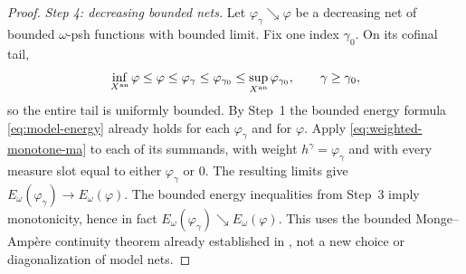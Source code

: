 \begin{proof}
\emph{Step 4: decreasing bounded nets.}  Let
\(\varphi_\gamma\searrow\varphi\) be a decreasing net of bounded
\(\omega\)-psh functions with bounded limit.  Fix one index \(\gamma_0\).
On its cofinal tail,
\[
 \inf_{X^{\mathrm{an}}}\varphi\leq\varphi\leq\varphi_\gamma
 \leq\varphi_{\gamma_0}\leq\sup_{X^{\mathrm{an}}}\varphi_{\gamma_0},
 \qquad \gamma\geq\gamma_0,
\]
so the entire tail is uniformly bounded.  By Step~1 the bounded energy
formula \eqref{eq:model-energy} already holds for each
\(\varphi_\gamma\) and for \(\varphi\).  Apply
\eqref{eq:weighted-monotone-ma} to each of its summands, with weight
\(h^\gamma=\varphi_\gamma\) and with every measure slot equal to either
\(\varphi_\gamma\) or \(0\).  The resulting limits give
\(E_\omega(\varphi_\gamma)\to E_\omega(\varphi)\).
The bounded energy inequalities from Step~3 imply monotonicity, hence in
fact \(E_\omega(\varphi_\gamma)\searrow E_\omega(\varphi)\).
This uses the bounded Monge--Amp\`ere continuity theorem already established
in , not a new choice or diagonalization of model nets.
\end{proof}
